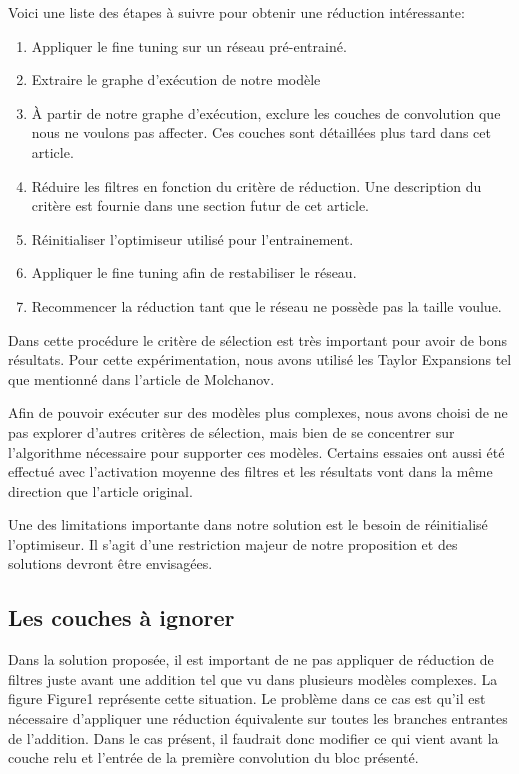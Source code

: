 \documentclass[12pt]{article}
\begin{document}
Voici une liste des étapes à suivre pour obtenir une réduction intéressante: 
\begin{enumerate}
\item Appliquer le fine tuning sur un réseau pré-entrainé. 
\item Extraire le graphe d'exécution de notre modèle 
\item À partir de notre graphe d'exécution, exclure les couches de convolution que nous ne voulons pas affecter. Ces couches sont détaillées plus tard dans cet article.
\item Réduire les filtres en fonction du critère de réduction. Une description du critère est fournie dans une section futur de cet article. 
\item Réinitialiser l'optimiseur utilisé pour l'entrainement.
\item Appliquer le fine tuning afin de restabiliser le réseau.
\item Recommencer la réduction tant que le réseau ne possède pas la taille voulue. 
\end{enumerate}

Dans cette procédure le critère de sélection est très important pour avoir de bons résultats. Pour cette expérimentation, nous avons utilisé les Taylor Expansions tel que mentionné dans l'article de Molchanov.

Afin de pouvoir exécuter sur des modèles plus complexes, nous avons choisi de ne pas explorer d'autres critères de sélection, mais bien de se concentrer sur l'algorithme nécessaire pour supporter ces modèles. Certains essaies ont aussi été effectué avec l'activation moyenne des filtres et les résultats vont dans la même direction que l'article original.

Une des limitations importante dans notre solution est le besoin de réinitialisé l'optimiseur. Il s'agit d'une restriction majeur de notre proposition et des solutions devront être envisagées.

\subsection{Les couches à ignorer }
Dans la solution proposée, il est important de ne pas appliquer de réduction de filtres juste avant une addition tel que vu dans plusieurs modèles complexes. La figure Figure1 représente cette situation. Le problème dans ce cas est qu’il est nécessaire d’appliquer une réduction équivalente sur toutes les branches entrantes de l'addition. Dans le cas présent, il faudrait donc modifier ce qui vient avant la couche relu et l'entrée de la première convolution du bloc présenté. 
\end{document}
